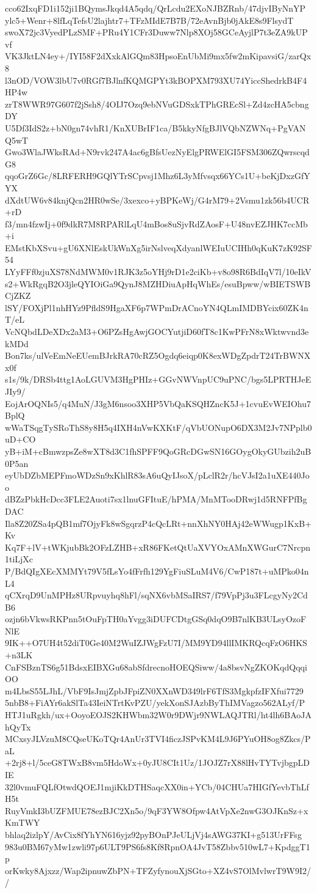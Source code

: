 cco62IxqFD1i152ji1BQymsJkqd4A5qdq/QrLcdu2EXoNJBZRnb/47djvIByNnYP
ylc5+Wenr+8lfLqTefsU2lajhtr7+TFzMIdE7B7B/72eAvnBjb0jAkE8s9FlsydT
swoX72jc3VyedPLzSMF+PRu4Y1CFr3Duww7Nlp8XOj58GCeAyjlP7t3eZA9kUPvf
VK3JktLN4ey+/IYI58F2dXxkAlGQm83HpsoEnUbMi9mx5fw2mKipavsiG/zarQx8
l3nOD/VOW3lbU7v0RGf7BJlnfKQMGPYt3kBOPXM793XU74YiccShedrkB4F4HP4w
zrT8WWR97G607f2jSsh8/4OIJ7Ozq9ebNVuGDSxkTPhGREcSl+Zd4zcHA5cbngDY
U5Df3IdS2z+bN0gn74vhR1/KnXUBrIF1ca/B5kkyNfgBJlVQbNZWNq+PgVANQ5wT
Gwo3WlaJWksRAd+N9rvk247A4ac6gBfsUezNyElgPRWElGI5FSM306ZQwrscqdG8
qqoGrZ6Gc/8LRFERH9GQlYTrSCpvsj1Mhz6L3yMfvsqx66YCs1U+beKjDxzGfYYX
dXdtUW6v84knjQcn2HR0wSe/3xexco+yBPKeWj/G4rM79+2Vsmu1zk56b4UCR+rD
f3/mn4fzwIj+0f9dkR7M8RPARlLqU4mBos8uSjvRdZAosF+U48nvEZJHK7ccMb+i
EMstKbXSvu+gU6XNlEskUkWnXg5irNslveqXdyanlWEIuUCIHh0qKuK7zK92SF54
LYyFFf0zjuXS78NdMWM0v1RJK3z5oYHj9rD1e2ciKb+v8o98R6BdIqV7l/10eIkV
s2+WkRgqB2O3jleQYIOiGa9QynJ8MZHDiuApHqWhEs/esuBpww/wBIETSWBCjZKZ
lSY/FOXjPl1nhHYz9PfldS9HgaXF6p7WPmDrACnoYN4QLmIMDBYcix60ZK4nT/eL
VcNQbdLDeXDx2aM3+O6PZsHgAwjGOCYutjiD60fT8c1KwPFrN8xWktwvnd3ekMDd
Bon7ks/ulVeEmNeEUemBJrkRA70cRZ5Ogdq6eiqp0K8exWDgZpdrT24TrBWNXx0f
s1s/9k/DRSb4ttg1AoLGUVM3HgPHIz+GGvNWVnpUC9uPNC/bgs5LPRTHJeEJIy9/
EojArOQNIs5/q4MuN/J3gM6nsoo3XHP5VbQaKSQHZncK5J+1cvuEvWEIOhu7BplQ
wWaTSqgTySRoThS8y8H5q4IXH4nVwKXKtF/qVbUONupO6DX3M2Jv7NPplb0uD+CO
yB+iM+cBmwzpsZe8wXT8d3C1fhSPFF9QoGRcDGwSN16GOygOkyGUbzih2uB0P5an
eyUbDZbMEPFmoWDzSn9xKhlR83sA6uQyIJsoX/pLclR2r/hcVJsI2a1uXE440Joo
dBZzPbkHcDcc3FLE2Auoti7sx1lnuGFItuE/hPMA/MnMTooDRwj1d5RNFPfBgDAC
Ila8Z20ZSa4pQB1mf7OjyFk8wSgqrzP4cQcLRt+nnXhNY0HAj42eWWugp1KxB+Kv
Kq7F+lV+tWKjubBk2OFzLZHB+xR86FKetQtUaXVYOxAMnXWGurC7Nrcpn1tiLjXc
P/BdQIgXEcXMMYt79V5fLsYo4fFrfh129YgFiuSLuM4V6/CwP187t+uMPko04nL4
qCXrqD9UnMPHz8URpvuyhq8hFl/sqNX6vbMSaIRS7/f79VpPj3u3FLcgyNy2CdB6
ozjn6bVkwsRKPnn5tOuFpTH0aYvgg3iDUFCDtgGSq0dqO9B7nlKB3ULsyOzoFNlE
9IK++O7UH4t52diT0Ge40M2WuIZJWgFzU7I/MM9YD94llIMKRQcqFzO6HKS+n3LK
CnFSBznTS6g51BdsxEIBXGu68abSfdrecnoHOEQSiww/4a8bsvNgZKOKqdQqqiOO
m4LbsS55LJhL/VbF9IsJmjZpbJFpiZN0XXnWD349lrF6TfS3MgkpfzIFXfui7729
5nbB8+FiAYr6akSlTa43IeiNTrtKvPZU/yekXonSJAzbByThIMVagzo562ALyf/P
HTJ1uRgkh/ux+OoyoEOJS2KHWbm32W0r9DWjr9NWLAQJTRl/ht4lh6BAoJAhQyTx
MCxsyJLVzuM8CQseUKoTQr4AnUr3TVI4ficzJSPvKM4L9J6PYuOH8og8Zkcs/PaL
+2rj8+l/5ceG8TWxB8vm5HdoWx+0yJU8CIt1Uz/1JOJZ7rX88lHvTYTvjbgpLDIE
32l0vmuFQLfOtwdQOEJ1mjiKkDTHSaqcXX0in+YCb/04CHUa7HIGfYevbThLfH5t
RuyVmkI3bUZFMUE78ezBJC2Xn5o/9qF3YW8Ofpw4AtVpXe2nwG3OJKnSz+xKmTWY
bhlaq2izlpY/AvCix8fYhYN616yjz92pyBOnPJeULjVj4sAWG37KI+g513UrFFsg
983u0BM67yMw1zwli97p6ULT9PS6fs8Kf8RpnOA4JvT58Zbbv510wL7+KpdggT1p
orKwky8Ajxzz/Wap2ipnuwZbPN+TFZyfynouXjSGto+XZ4vS7OlMvlwrT9W9I2//
